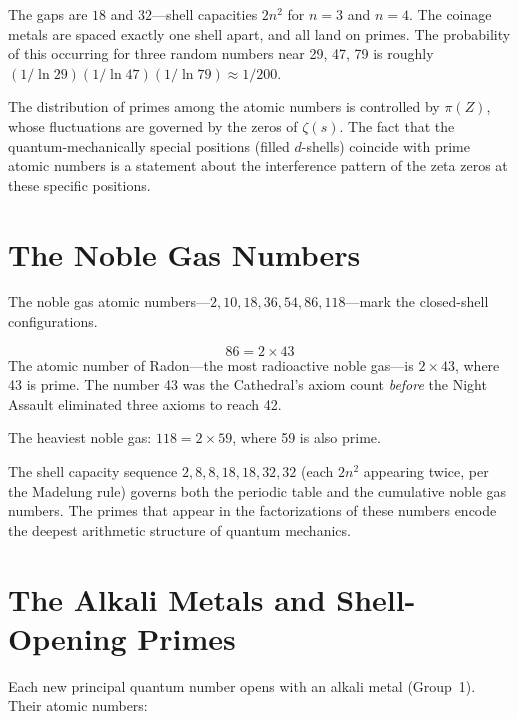 \documentclass[11pt,a4paper]{article}
\begin{document}
The gaps are $18$ and $32$---shell capacities $2n^2$ for $n = 3$
and $n = 4$. The coinage metals are spaced exactly one shell apart,
and all land on primes. The probability of this occurring for three
random numbers near 29, 47, 79 is roughly
$(1/\ln 29)(1/\ln 47)(1/\ln 79) \approx 1/200$.

The distribution of primes among the atomic numbers is controlled by
$\pi(Z)$, whose fluctuations are governed by the zeros of $\zeta(s)$.
The fact that the quantum-mechanically special positions (filled
$d$-shells) coincide with prime atomic numbers is a statement about
the interference pattern of the zeta zeros at these specific positions.

\section{The Noble Gas Numbers}
\label{sec:noble}

The noble gas atomic numbers---$2, 10, 18, 36, 54, 86, 118$---mark
the closed-shell configurations.

\begin{observation}
\[
  86 = 2 \times 43
\]
The atomic number of Radon---the most radioactive noble gas---is
$2 \times 43$, where 43 is prime. The number 43 was the Cathedral's
axiom count \emph{before} the Night Assault eliminated three axioms
to reach 42.

The heaviest noble gas: $118 = 2 \times 59$, where 59 is also prime.

The shell capacity sequence $2, 8, 8, 18, 18, 32, 32$ (each $2n^2$
appearing twice, per the Madelung rule) governs both the periodic
table and the cumulative noble gas numbers. The primes that appear
in the factorizations of these numbers encode the deepest arithmetic
structure of quantum mechanics.
\end{observation}

\section{The Alkali Metals and Shell-Opening Primes}

Each new principal quantum number opens with an alkali metal
(Group~1). Their atomic numbers:
\end{document}
